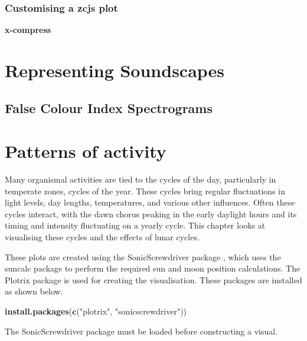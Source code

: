 \documentclass[
]{book}
\newenvironment{Shaded}{\begin{snugshade}}{\end{snugshade}}
\newcommand{\FunctionTok}[1]{\textcolor[rgb]{0.13,0.29,0.53}{\textbf{#1}}}
\newcommand{\NormalTok}[1]{#1}
\newcommand{\StringTok}[1]{\textcolor[rgb]{0.31,0.60,0.02}{#1}}
\begin{document}
\hypertarget{customising-a-zcjs-plot}{%
\subsection{Customising a zcjs plot}\label{customising-a-zcjs-plot}}

\textbf{x-compress}

\hypertarget{representing-soundscapes}{%
\chapter{Representing Soundscapes}\label{representing-soundscapes}}

\hypertarget{false-colour-index-spectrograms}{%
\section{False Colour Index Spectrograms}\label{false-colour-index-spectrograms}}

\hypertarget{patterns-of-activity}{%
\chapter{Patterns of activity}\label{patterns-of-activity}}

Many organismal activities are tied to the cycles of the day, particularly in temperate zones, cycles of the year. These cycles bring regular fluctuations in light levels, day lengths, temperatures, and various other influences. Often these cycles interact, with the dawn chorus peaking in the early daylight hours and its timing and intensity fluctuating on a yearly cycle. This chapter looks at visualising these cycles and the effects of lunar cycles.

These plots are created using the SonicScrewdriver package \citep{sonicscrewdriver}, which uses the suncalc package \citep{suncalc} to perform the required sun and moon position calculations. The Plotrix package \citep{plotrix} is used for creating the visualisation. These packages are installed as shown below.

\begin{Shaded}
\begin{Highlighting}[]
\FunctionTok{install.packages}\NormalTok{(}\FunctionTok{c}\NormalTok{(}\StringTok{"plotrix"}\NormalTok{, }\StringTok{"sonicscrewdriver"}\NormalTok{))}
\end{Highlighting}
\end{Shaded}

The SonicScrewdriver package must be loaded before constructing a visual.
\end{document}
